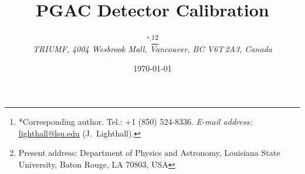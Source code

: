 \documentclass{article}
\begin{document}
\title{PGAC Detector Calibration}
\author{\authname$^\textrm{*,}$\thanks{\hspace*{-0.5em}*Corresponding author.  {Tel.:} +1 (850) 524-8336.%
 \textit{ E-mail address:} \href{mailto:lighthall@lsu.edu}{lighthall@lsu.edu} (J.\ Lighthall).}\thanks{Present address: Department of Physics and Astronomy, Louisiana State University, Baton Rouge, LA 70803, USA}\\ \small \itshape TRIUMF, 4004 Wesbrook Mall, Vancouver, BC V6T\,2A3, Canada}
\date{\small \longusdate \today}%
\maketitle


\thispagestyle{fancy}
\renewcommand{\headrulewidth}{0pt}
\rfoot{\rmfamily\footnotesize\itshape\today ~\currenttime{}~\timezone}



%


%
\end{document}

